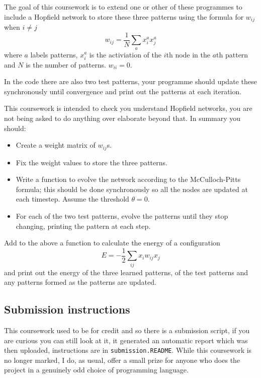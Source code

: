 \documentclass[12pt]{article}
\begin{document}
The goal of this coursework is to extend one or other of these
programmes to include a Hopfield network to store these three
patterns using the formula for $w_{ij}$ when $i\not=j$
\begin{equation}
w_{ij}=\frac{1}{N}\sum_a x_i^a x_j^a
\end{equation}
where $a$ labels patterns, $x_i^a$ is the activiation of the $i$th
node in the $a$th pattern and $N$ is the number of
patterns. $w_{ii}=0$.

In the code there are also two test patterns, your programme should
update these synchronously until convergence and print out the
patterns at each iteration. 


This coursework is intended to check you understand Hopfield networks,
you are not being asked to do anything over elaborate beyond that. In
summary you should:
\begin{itemize}
\item Create a weight matrix of $w_{ij}$s.
\item Fix the weight values to store the three patterns.
\item Write a function to evolve the network according to the
  McCulloch-Pitts formula; this should be done synchronously so all the nodes are updated at each timestep. Assume the threshold $\theta=0$.
\item For each of the two test patterns, evolve the patterns until they stop changing, printing the pattern at each step.
\end{itemize}

Add to the above a function to calculate the energy of a configuration
\begin{equation}
E=-\frac{1}{2}\sum_{ij} x_i w_{ij} x_j
\end{equation}
and print out the energy of the three learned patterns, of the test
patterns and any patterns formed as the patterns are updated.

\subsection*{Submission instructions}

This coursework used to be for credit and so there is a submission
script, if you are curious you can still look at it, it generated an
automatic report which was then uploaded, instructions are in
\texttt{submission.README}. While this coursework is no longer marked,
I do, as usual, offer a small prize for anyone who does the project in
a genuinely odd choice of programming language.
\end{document}
